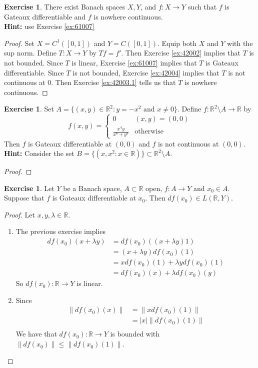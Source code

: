 \documentclass[12pt]{amsart}
\theoremstyle{definition}
\newtheorem{ex}[definition]{Exercise}
\newcommand{\lam}{\lambda}
\newcommand{\R}{\mathbb{R}}
\newcommand{\tbf}[1]{\textbf{#1}}
\DeclareMathOperator*{\0}{\mbf{0}}
\DeclareMathOperator*{\1}{\mbf{1}}
\newcommand{\lex}[1]{\label{ex:#1}}
\newcommand{\rex}[1]{Exercise \ref{ex:#1}}
\begin{document}
	\begin{ex} \lex{61008}
	There exist Banach spaces $X,Y$, and $f:X \rightarrow Y$ such that $f$ is Gateaux differentiable and $f$ is nowhere continuous. \\
	\tbf{Hint:} use \rex{61007}
	\end{ex}
	
	\begin{proof}
	Set $X = C^1([0, 1])$ and $Y = C([0,1])$. Equip both $X$ and $Y$ with the sup norm. Define $T: X \rightarrow Y$ by $Tf = f'$. Then \rex{42002} implies that $T$ is not bounded. Since $T$ is linear, \rex{61007} implies that $T$ is Gateaux differentiable. Since $T$ is not bounded, \rex{42004} implies that $T$ is not continuous at $0$. Then \rex{42003.1} tells us that $T$ is nowhere continuous. 
	\end{proof}
	
	\begin{ex} \lex{61008.5}
	Set $A = \{(x,y) \in \R^2: y = -x^2 \text{ and } x \neq 0\}$. Define $f: \R^2 \setminus A \rightarrow \R$ by 
	\[f(x,y) = 
	\begin{cases}
	0 & (x,y) = (0,0) \\
	\frac{x^4y}{x^6 + y^3} & \text{otherwise}
	\end{cases}	
	\]
	Then $f$ is Gateaux differentiable at $(0,0)$ and $f$ is not continuous at $(0,0)$. \\
	\tbf{Hint:} Consider the set $B = \{(x, x^2:x \in \R)\} \subset \R^2 \setminus A$. 
	\end{ex}
	
	\begin{proof}
	
	\end{proof}
	
	
	
	\begin{ex} \lex{61009}
	Let $Y$ be a Banach space, $A \subset \R$ open, $f:A \rightarrow Y$ and $x_0 \in A$. Suppose that $f$ is Gateaux differentiable at $x_0$. Then $df(x_0) \in L(\R,Y)$.
	\end{ex}
	
	\begin{proof}
	Let $x,y ,\lam \in \R$. 
	\begin{enumerate}
	\item The previous exercise implies 
	\begin{align*}
	df(x_0)(x + \lam y) 
	&= df(x_0)((x+\lam y)1)  \\
	&= (x+\lam y)df(x_0)(1) \\
	&= xdf(x_0)(1) + \lam y df(x_0)(1) \\
	&= df(x_0)(x) + \lam df(x_0)(y)
	\end{align*}
	So $df(x_0):\R \rightarrow Y$ is linear.
	\item Since 
	\begin{align*}
	\|df(x_0)(x)\| 
	&= \|xdf(x_0)(1)\| \\
	&= |x| \|df(x_0)(1)\| \\
	\end{align*}	
	We have that $df(x_0):\R \rightarrow Y$ is bounded with $\|df(x_0)\| \leq \|df(x_0)(1)\|$. 
	\end{enumerate}
	\end{proof}
	
\end{document}
